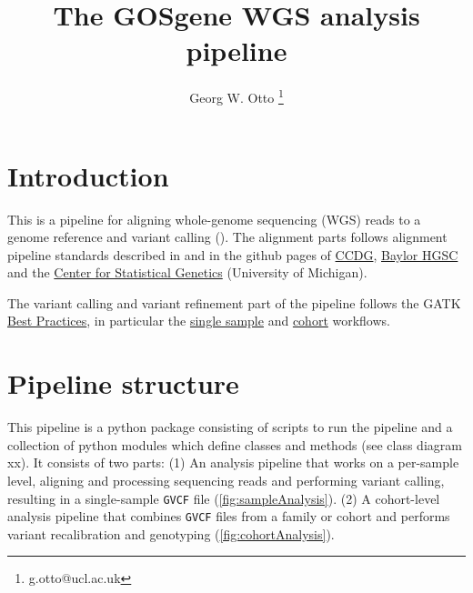 \documentclass[a4paper]{article}
\title{The GOSgene WGS analysis pipeline}
\author{Georg W. Otto \thanks{g.otto@ucl.ac.uk}}
\affil{The UCL Institute of Child Health}
\begin{document}
\maketitle

\tableofcontents

\section{Introduction}
\label{sec:introduction}

This is a pipeline for aligning whole-genome sequencing (WGS) reads to
a genome reference and variant calling
(). The
alignment parts follows alignment pipeline standards described in
\citep{Regier2018Functionalequivalenceof} and in the github pages of
\href{https://github.com/CCDG/Pipeline-Standardization/blob/master/PipelineStandard.md}{CCDG},
\href{https://github.com/HGSC-NGSI/HgV_Protocol_Descriptions/blob/master/hgv_ccdg_resequencing.md}{Baylor
  HGSC} and the
\href{https://github.com/statgen/docker-alignment}{Center for
  Statistical Genetics} (University of Michigan).

The variant calling and variant refinement part of the pipeline
follows the GATK
\href{https://software.broadinstitute.org/gatk/best-practices/workflow?id=11145}{Best
  Practices}, in particular the
\href{https://github.com/gatk-workflows/broad-prod-wgs-germline-snps-indels/blob/master/PairedEndSingleSampleWf.wdl}{single
  sample} and
\href{https://github.com/gatk-workflows/broad-prod-wgs-germline-snps-indels/blob/master/JointGenotypingWf.wdl}{cohort} workflows.


\section{Pipeline structure}
\label{sec:pipeline-structure}

This pipeline is a python package consisting of scripts to run the
pipeline and a collection of python modules which define classes and
methods (see class diagram xx). It consists of two parts: (1) An
analysis pipeline that works on a per-sample level, aligning and
processing sequencing reads and performing variant calling, resulting
in a single-sample \texttt{GVCF} file
(\cref{fig:sampleAnalysis}). (2) A cohort-level analysis pipeline that
combines \texttt{GVCF} files from a family or cohort and performs
variant recalibration and genotyping (\cref{fig:cohortAnalysis}).
\end{document}
